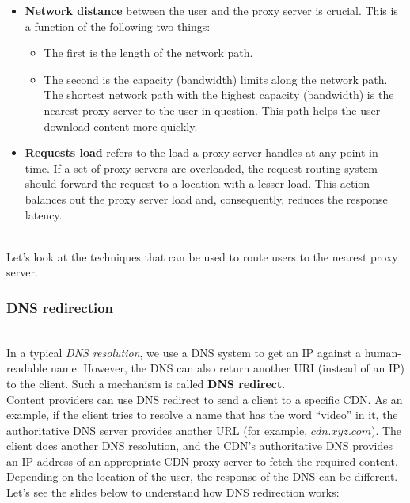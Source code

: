 \begin{itemize}
\item
\protect{}\label{REXFs9FIWn7Q4Tk2w2SEp}
\textbf{Network distance} between the user and the proxy server is crucial. This is a function of the following two things:

\begin{itemize}
\item
The first is the length of the network path.
\item
The second is the capacity (bandwidth) limits along the network path.\\
The shortest network path with the highest capacity (bandwidth) is the nearest proxy server to the user in question. This path helps the user download content more quickly.
\end{itemize}
\item
\protect{}\label{ZmOma8cdbhkR-GhKSKVO-}
\textbf{Requests load} refers to the load a proxy server handles at any point in time. If a set of proxy servers are overloaded, the request routing system should forward the request to a location with a lesser load. This action balances out the proxy server load and, consequently, reduces the response latency.
\end{itemize}
\\
Let's look at the techniques that can be used to route users to the nearest proxy server.

\subsubsection{DNS redirection}\label{vaiMZomn1HJrtPGdVzM9b}
\\
In a typical \emph{DNS resolution}, we use a DNS system to get an IP against a human-readable name. However, the DNS can also return another URI (instead of an IP) to the client. Such a mechanism is called \textbf{DNS redirect}.
\\
Content providers can use DNS redirect to send a client to a specific CDN. As an example, if the client tries to resolve a name that has the word ``video'' in it, the authoritative DNS server provides another URL (for example, \protect{}\label{katex_inline_hQMv9QKMO2HCJEXgf2Ww-}{{{\(cdn.xyz.com\)}}}). The client does another DNS resolution, and the CDN's authoritative DNS provides an IP address of an appropriate CDN proxy server to fetch the required content.
\\
Depending on the location of the user, the response of the DNS can be different. Let's see the slides below to understand how DNS redirection works:

